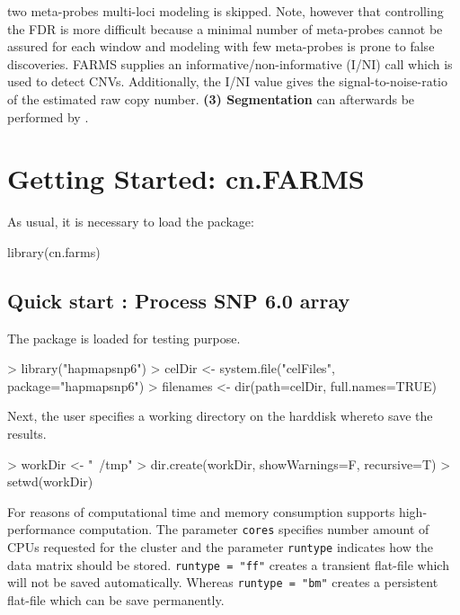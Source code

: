 \documentclass[article]{bioinf}
\begin{document}
two meta-probes multi-loci modeling is skipped. 
Note, however that controlling the FDR is more
difficult because a minimal number of meta-probes cannot be assured
for each window and modeling with few meta-probes is prone to false discoveries.
FARMS supplies an informative/non-informative (I/NI) call \citep{Talloen:07,Talloen:10}
which is used to detect CNVs. Additionally, the I/NI value  gives the
signal-to-noise-ratio of the estimated raw copy number.\linebreak
{\bf(3) Segmentation} can afterwards be performed by  .







\section{Getting Started: cn.FARMS}
\label{sec:started}

As usual, it is necessary to load the  package:
\begin{Sinput}
library(cn.farms)
\end{Sinput}

\subsection{Quick start : Process SNP 6.0 array}

\noindent The  package is loaded for testing purpose.

\begin{Sinput}
> library("hapmapsnp6") 
> celDir <- system.file("celFiles", package="hapmapsnp6")
> filenames <- dir(path=celDir, full.names=TRUE)
\end{Sinput}

\noindent  Next, the user specifies a working directory on the harddisk whereto save the results.

\begin{Sinput}
> workDir <- "~/tmp"
> dir.create(workDir, showWarnings=F, recursive=T)
> setwd(workDir)
\end{Sinput}

\noindent For reasons of computational time and memory consumption  supports high-performance computation. 
The parameter  \verb+cores+ specifies number amount of CPUs requested for the cluster and  the parameter  \verb+runtype+
indicates how the data matrix should be stored.   \verb+runtype = "ff"+ creates a transient flat-file which will not be saved automatically.
Whereas  \verb+runtype = "bm"+ creates a persistent flat-file which can be save permanently.
\end{document}
